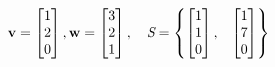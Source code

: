 \documentclass[12 pt]{slides}
\begin{document}
\begingroup
\[\textbf{v} = \begin{bmatrix}1\\2\\0\end{bmatrix}, \textbf{w} = \begin{bmatrix}3\\2\\1\end{bmatrix},\quad \emph{S} = 
\begin{Bmatrix}\begin{bmatrix}1\\1\\0\end{bmatrix}, & \begin{bmatrix}1\\7\\0\end{bmatrix} \end{Bmatrix}\]
\endgroup
\end{document}

